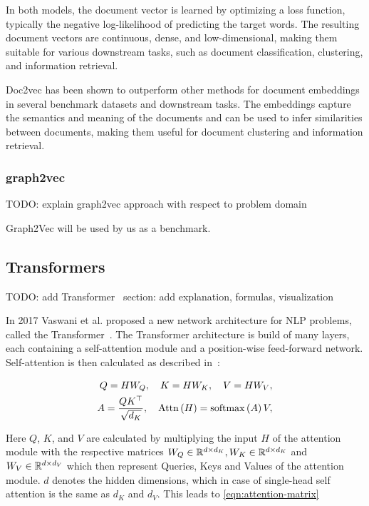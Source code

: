 In both models, the document vector is learned by optimizing a loss function, typically the negative log-likelihood of predicting the target words. The resulting document vectors are continuous, dense, and low-dimensional, making them suitable for various downstream tasks, such as document classification, clustering, and information retrieval.

Doc2vec has been shown to outperform other methods for document embeddings in several benchmark datasets and downstream tasks. The embeddings capture the semantics and meaning of the documents and can be used to infer similarities between documents, making them useful for document clustering and information retrieval.

\subsubsection{graph2vec}
TODO: explain graph2vec \cite{2017graph2vec} approach with respect to problem domain

Graph2Vec will be used by us as a benchmark.

\subsection{Transformers}
TODO: add Transformer~\cite{vaswani2017attention} section: add explanation, formulas, visualization

In 2017 Vaswani et al. proposed a new network architecture for NLP problems, called the Transformer~\cite{vaswani2017attention}. The Transformer architecture is build of many layers, each containing a self-attention module and a position-wise feed-forward network. Self-attention is then calculated as described in~\cite{2021graphormer}:

\begin{align}
    Q = HW_Q,\quad K = HW_K,\quad V = HW_V,\label{eqn:attention-alpha}\\
    A = \frac{QK^\top}{\sqrt{d_K}}, \quad \mathrm{Attn}\left(H\right) = \mathrm{softmax}\left(A\right)V,\label{eqn:attention-alpha2}
\end{align}

Here $Q$, $K$, and $V$ are calculated by multiplying the input $H$ of the attention module with the respective matrices $W_Q\in\mathbb{R}^{d\times d_K}, W_K\in\mathbb{R}^{d\times d_K}$ and $ W_V\in\mathbb{R}^{d\times d_V}$ which then represent Queries, Keys and Values of the attention module. $d$ denotes the hidden dimensions, which in case of single-head self attention is the same as $d_K$ and $d_V$. This leads to \autoref{eqn:attention-matrix}

